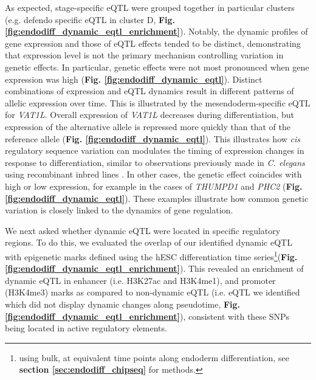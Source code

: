 As expected, stage-specific eQTL were grouped together in particular clusters (e.g. defendo specific eQTL in cluster D, \textbf{Fig. \ref{fig:endodiff_dynamic_eqtl_enrichment}}). 
Notably, the dynamic profiles of gene expression and those of eQTL effects tended to be distinct, demonstrating that expression level is not the primary mechanism controlling variation in genetic effects. 
In particular, genetic effects were not most pronounced when gene expression was high (\textbf{Fig. \ref{fig:endodiff_dynamic_eqtl}}).
Distinct combinations of expression and eQTL dynamics result in different patterns of allelic expression over time. 
This is illustrated by the mesendoderm-specific eQTL for \textit{VAT1L}. 
Overall expression of \textit{VAT1L} decreases during differentiation, but expression of the alternative allele is repressed more quickly than that of the reference allele (\textbf{Fig. \ref{fig:endodiff_dynamic_eqtl}}). 
This illustrates how \textit{cis} regulatory sequence variation can modulates the timing of expression changes in response to differentiation, similar to observations previously made in \textit{C. elegans} using recombinant inbred lines \cite{francesconi2014effects}. 
In other cases, the genetic effect coincides with high or low expression, for example in the cases of \textit{THUMPD1} and \textit{PHC2} (\textbf{Fig. \ref{fig:endodiff_dynamic_eqtl}}). 
These examples illustrate how common genetic variation is closely linked to the dynamics of gene regulation. 

We next asked whether dynamic eQTL were located in specific regulatory regions. 
To do this, we evaluated the overlap of our identified dynamic eQTL with epigenetic marks defined using the hESC differentiation time series\footnote{using bulk, at equivalent time points along endoderm differentiation, see \textbf{section \ref{sec:endodiff_chipseq}} for methods.}(\textbf{Fig. \ref{fig:endodiff_dynamic_eqtl_enrichment}}). 
This revealed an enrichment of dynamic eQTL in enhancer (i.e. H3K27ac and H3K4me1), and promoter (H3K4me3) marks as compared to non-dynamic eQTL (i.e. eQTL we identified which did not display dynamic changes along pseudotime, \textbf{Fig. \ref{fig:endodiff_dynamic_eqtl_enrichment}}), consistent with these SNPs being located in active regulatory elements.

\vspace{2mm}

